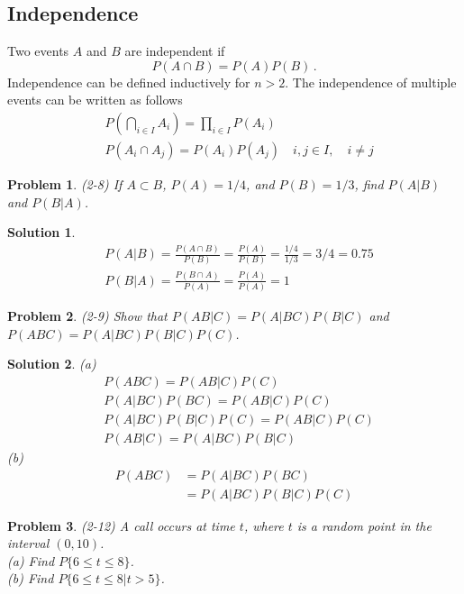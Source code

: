\documentclass{article}
\newtheorem{problem}{Problem}[section]
\newtheorem{solution}{Solution}[section]
\begin{document}
		\subsection{Independence}
			Two events $A$ and $B$ are independent if
			\begin{equation}
				P(A\cap B)=P(A)P(B)\,.
			\end{equation}
			Independence can be defined inductively for $n>2$. The independence of multiple events can be written as follows
			\begin{align}
				&P\left(\bigcap_{i\in I}{A_i}\right)=\prod_{i\in I}{P(A_i)}\,\\
				&P(A_i\cap A_j)=P(A_i)P(A_j)\quad i,j\in I,\quad i\neq j
			\end{align}
		\begin{problem}
			(2-8) If $A\subset B$, $P(A)=1/4$, and $P(B)=1/3$, find $P(A|B)$ and $P(B|A)$.
		\end{problem}
		\begin{solution}
			\begin{align*}
				&P(A|B)=\frac{P(A\cap B)}{P(B)}=\frac{P(A)}{P(B)}=\frac{1/4}{1/3}=3/4=0.75\\
				&P(B|A)=\frac{P(B\cap A)}{P(A)}=\frac{P(A)}{P(A)}=1
			\end{align*}
		\end{solution}
		\begin{problem}
			(2-9) Show that $P(AB|C)=P(A|BC)P(B|C)$ and $P(ABC)=P(A|BC)P(B|C)P(C)$.
		\end{problem}
		\begin{solution}
			(a)
			\begin{align*}
				&P(ABC)=P(AB|C)P(C)\\
				&P(A|BC)P(BC)=P(AB|C)P(C)\\
				&P(A|BC)P(B|C)P(C)=P(AB|C)P(C)\\
				&P(AB|C)=P(A|BC)P(B|C)
			\end{align*}
			(b)
			\begin{align*}
				P(ABC)&=P(A|BC)P(BC)\\
				&=P(A|BC)P(B|C)P(C)
			\end{align*}
		\end{solution}
		\begin{problem}
			(2-12) A call occurs at time $t$, where $t$ is a random point in the interval $(0,10)$.\\
			(a) Find $P\{6\leq t\leq 8\}$.\\
			(b) Find $P\{6\leq t\leq 8|t>5\}$.
		\end{problem}
\end{document}

